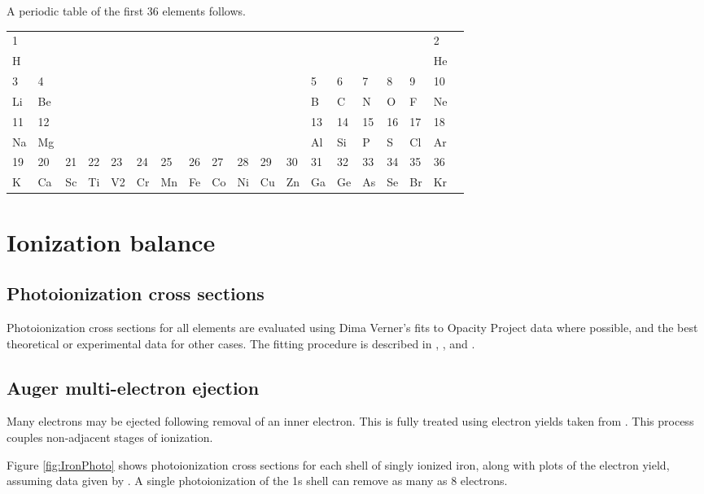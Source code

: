 A periodic table of the first 36 elements follows.

\begin{tabular}{lllllllllllllllllll}
\hline
1&&&&&&&&&&&&&&&&&2\\
H&&&&&&&&&&&&&&&&&He\\
3&4&&&&&&&&&&&5&6&7&8&9&10\\
Li&Be&&&&&&&&&&&B&C&N&O&F&Ne\\
11&12&&&&&&&&&&&13&14&15&16&17&18\\
Na&Mg&&&&&&&&&&&Al&Si&P&S&Cl&Ar\\
19&20&21&22&23&24&25&26&27&28&29&30&31&32&33&34&35&36\\
K&Ca&Sc&Ti&V2&Cr&Mn&Fe&Co&Ni&Cu&Zn&Ga&Ge&As&Se&Br&Kr\\
\hline
\end{tabular}

\section{Ionization balance}

\subsection{Photoionization cross sections}

Photoionization cross sections for all elements are evaluated using Dima
Verner's fits to Opacity Project data where possible, and the best
theoretical or experimental data for other cases.
The fitting procedure
is described in \citet{Verner1993}, \citet{Verner1995},
and \citet{VernerFerlandKorista1996}.

\subsection{Auger multi-electron ejection}

Many electrons may be ejected following removal of an inner electron.
This is fully treated using electron yields taken from
\citet{Kaastra1993}.
This process couples non-adjacent stages of ionization.

Figure \ref{fig:IronPhoto} shows photoionization cross sections for each shell of singly
ionized iron, along with plots of the electron yield, assuming data given
by \citet{Kaastra1993}.  A single photoionization of the 1s shell can
remove as many as 8 electrons.

